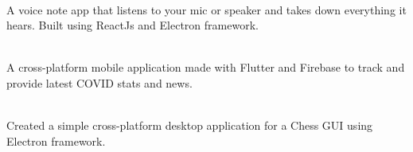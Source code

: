 \documentclass[]{dev-cv}
\begin{document}
\begin{minipage}[t]{0.66\textwidth}
 \\
\vspace{\topsep}
A voice note app that listens to your mic or speaker and takes down everything it hears. Built using ReactJs and Electron framework.
\sectionsep 

\\
\vspace{\topsep}
A cross-platform mobile application made with Flutter and Firebase to track and provide latest COVID stats and news.
\sectionsep

  \\
\vspace{\topsep}
Created a simple cross-platform desktop application for a Chess GUI using Electron framework.
\sectionsep


\end{minipage} 
\end{document}

